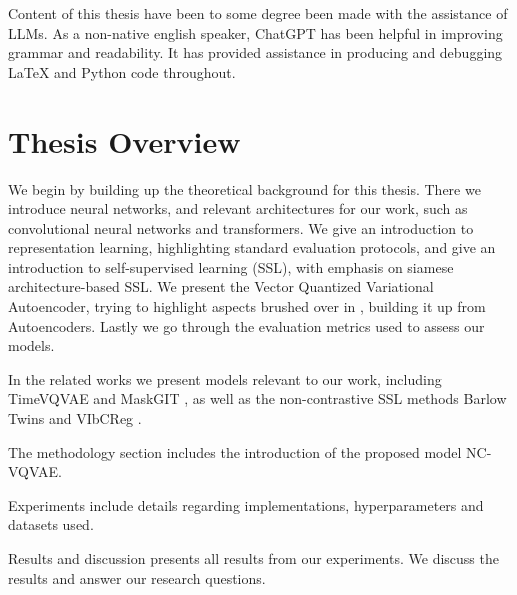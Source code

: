 \documentclass[../../thesis.tex]{subfiles}
\begin{document}
Content of this thesis have been to some degree been made with the assistance of LLMs. As a non-native english speaker, ChatGPT has been helpful in improving grammar and readability. It has provided assistance in producing and debugging LaTeX and Python code throughout.

\section{Thesis Overview}


We begin by building up the theoretical background for this thesis. There we introduce neural networks, and relevant architectures for our work, such as convolutional neural networks and transformers. We give an introduction to representation learning, highlighting standard evaluation protocols, and give an introduction to self-supervised learning (SSL), with emphasis on siamese architecture-based SSL. We present the Vector Quantized Variational Autoencoder, trying to highlight aspects brushed over in \cite{VQVAE}, building it up from Autoencoders. Lastly we go through the evaluation metrics used to assess our models.\newline

In the related works we present models relevant to our work, including TimeVQVAE \cite{TimeVQVAE} and MaskGIT \cite{chang2022maskgit}, as well as the non-contrastive SSL methods Barlow Twins \cite{zbontar2021barlow} and VIbCReg \cite{lee2024computer}.\newline

The methodology section includes the introduction of the proposed model NC-VQVAE.\newline

Experiments include details regarding implementations, hyperparameters and datasets used. \newline

Results and discussion presents all results from our experiments. We discuss the results  and answer our research questions. 
\end{document}
